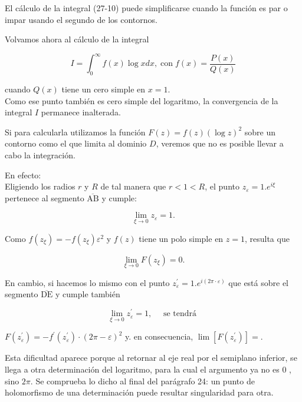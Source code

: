 \documentclass[10pt]{article}
\theoremstyle{plain}
\theoremstyle{definition}
\theoremstyle{remark}
\begin{document}
El cálculo de la integral (27-10) puede simplificarse cuando la función es par o impar usando el segundo de los contornos.

Volvamos ahora al cálculo de la integral

$$
I=\int_{0}^{\infty} f(x) \log x d x, \operatorname{con} f(x)=\frac{P(x)}{Q(x)}
$$

cuando $Q(x)$ tiene un cero simple en $x=1$.\\
Como ese punto también es cero simple del logaritmo, la convergencia de la integral $I$ permanece inalterada.

Si para calcularla utilizamos la función $F(z)=f(z)(\log z)^{2}$ sobre un contorno como el que limita al dominio $D$, veremos que no es posible llevar a cabo la integración.

En efecto:\\
Eligiendo los radios $r$ y $R$ de tal manera que $r<1<R$, el punto $z_{\varepsilon}=1 . e^{i \xi}$ pertenece al segmento $\overline{\mathrm{AB}}$ y cumple:

$$
\lim _{\xi \rightarrow 0} z_{\varepsilon}=1 .
$$


Como $f\left(z_{\xi}\right)=-f\left(z_{\xi}\right) \varepsilon^{2}$ y $f(z)$ tiene un polo simple en $z=1$, resulta que

$$
\lim _{\xi \rightarrow 0} F\left(z_{\xi}\right)=0 .
$$

En cambio, si hacemos lo mismo con el punto $z_{\varepsilon}^{\prime}=1 . e^{i(2 \pi \cdot \varepsilon)}$ que está sobre el segmento $\overline{\mathrm{DE}}$ y cumple también

$$
\lim _{\xi \rightarrow 0} z_{\varepsilon}^{\prime}=1, \quad \text { se tendrá }
$$

$F\left(z_{\varepsilon}^{\prime}\right)=-f^{\prime}\left(z_{\varepsilon}^{\prime}\right) \cdot(2 \pi-\varepsilon)^{2}$ y. en consecuencia, $\lim \left[F\left(z_{\varepsilon}^{\prime}\right)\right]=$.

Esta dificultad aparece porque al retornar al eje real por el semiplano inferior, se llega a otra determinación del logaritmo, para la cual el argumento ya no es 0 , sino $2 \pi$. Se comprueba lo dicho al final del parágrafo 24: un punto de holomorfismo de una determinación puede resultar singularidad para otra.
\end{document}
